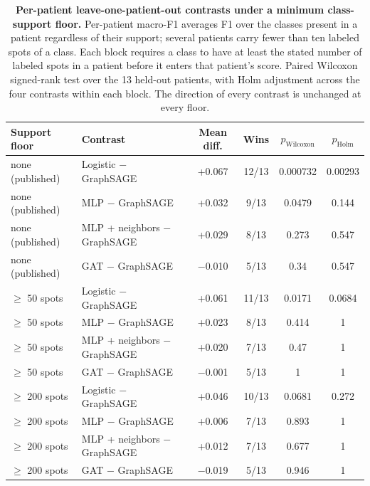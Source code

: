 \documentclass[11pt,letterpaper]{article}
\begin{document}
\begin{table}[H]
\centering
\caption{\textbf{Per-patient leave-one-patient-out contrasts under a minimum class-support floor.} Per-patient macro-F1 averages F1 over the classes present in a patient regardless of their support; several patients carry fewer than ten labeled spots of a class. Each block requires a class to have at least the stated number of labeled spots in a patient before it enters that patient's score. Paired Wilcoxon signed-rank test over the 13 held-out patients, with Holm adjustment across the four contrasts within each block. The direction of every contrast is unchanged at every floor.}
\label{tab:s12}
\footnotesize
\begin{tabular}{llcccc}
\toprule
\textbf{Support floor} & \textbf{Contrast} & \textbf{Mean diff.} & \textbf{Wins} & $p_\mathrm{Wilcoxon}$ & $p_\mathrm{Holm}$ \\
\midrule
none (published) & Logistic $-$ GraphSAGE & +0.067 & 12/13 & 0.000732 & 0.00293 \\
none (published) & MLP $-$ GraphSAGE & +0.032 & 9/13 & 0.0479 & 0.144 \\
none (published) & MLP + neighbors $-$ GraphSAGE & +0.029 & 8/13 & 0.273 & 0.547 \\
none (published) & GAT $-$ GraphSAGE & $-$0.010 & 5/13 & 0.34 & 0.547 \\
\midrule
$\geq$ 50 spots & Logistic $-$ GraphSAGE & +0.061 & 11/13 & 0.0171 & 0.0684 \\
$\geq$ 50 spots & MLP $-$ GraphSAGE & +0.023 & 8/13 & 0.414 & 1 \\
$\geq$ 50 spots & MLP + neighbors $-$ GraphSAGE & +0.020 & 7/13 & 0.47 & 1 \\
$\geq$ 50 spots & GAT $-$ GraphSAGE & $-$0.001 & 5/13 & 1 & 1 \\
\midrule
$\geq$ 200 spots & Logistic $-$ GraphSAGE & +0.046 & 10/13 & 0.0681 & 0.272 \\
$\geq$ 200 spots & MLP $-$ GraphSAGE & +0.006 & 7/13 & 0.893 & 1 \\
$\geq$ 200 spots & MLP + neighbors $-$ GraphSAGE & +0.012 & 7/13 & 0.677 & 1 \\
$\geq$ 200 spots & GAT $-$ GraphSAGE & $-$0.019 & 5/13 & 0.946 & 1 \\
\bottomrule
\end{tabular}
\end{table}

\vspace{1.5em}
\end{document}
